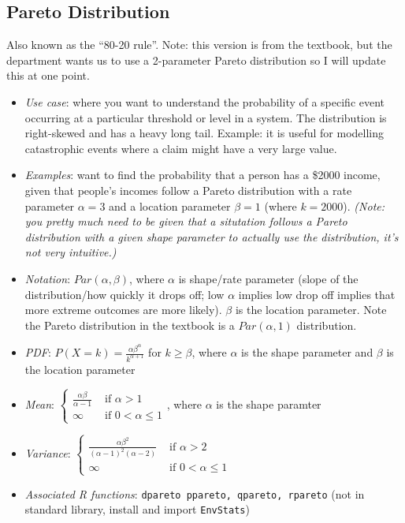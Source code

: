 \documentclass[12pt]{article}
\begin{document}
\subsection*{Pareto Distribution}

Also known as the ``80-20 rule''. Note: this version is from the textbook,
but the department wants us to use a 2-parameter Pareto distribution so I
will update this at one point.

\begin{itemize}
	\item \textit{Use case}: where you want to understand the probability of a
	      specific event occurring at a particular threshold or level in a system. The
	      distribution is right-skewed and has a heavy long tail. Example: it is
	      useful for modelling catastrophic events where a claim might have a
	      very large value.
	\item \textit{Examples}: want to find the probability that a person has
	      a \$2000 income, given that people's incomes follow a Pareto distribution
	      with a rate parameter $\alpha = 3$ and a location parameter $\beta = 1$
	      (where $k = 2000$). \emph{(Note: you pretty much need to be given
		      that a situtation follows a Pareto distribution with a given shape
		      parameter to actually use the distribution, it's not very intuitive.)}
	\item \textit{Notation}: $Par(\alpha, \beta)$, where $\alpha$ is shape/rate
	      parameter (slope of the distribution/how quickly it drops off; low
	      $\alpha$ implies low drop off implies that more extreme outcomes are
	      more likely). $\beta$ is the location parameter. Note the Pareto distribution
	      in the textbook is a $Par(\alpha, 1)$ distribution.
	\item \textit{PDF}: $P(X = k) = \frac{\alpha \beta^{\alpha}}{k^{\alpha +
					      1}}$ for $k \geq \beta$, where $\alpha$ is the shape parameter and
	      $\beta$ is the location parameter
	\item \textit{Mean}: $\begin{cases}
			      \frac{\alpha\beta}{\alpha - 1} & \text{ if } \alpha > 1        \\
			      \infty                         & \text{ if } 0 < \alpha \leq 1
		      \end{cases}$, where $\alpha$ is the shape paramter
	\item \textit{Variance}: $\begin{cases}
			      \frac{\alpha \beta^2}{(\alpha-1)^2(\alpha-2)} & \text{ if } \alpha > 2        \\
			      \infty                                        & \text{ if } 0 < \alpha \leq 1
		      \end{cases}$
	\item \textit{Associated R functions}: \verb|dpareto ppareto, qpareto, rpareto| (not in standard library, install and import \verb|EnvStats|)
\end{itemize}
\end{document}
